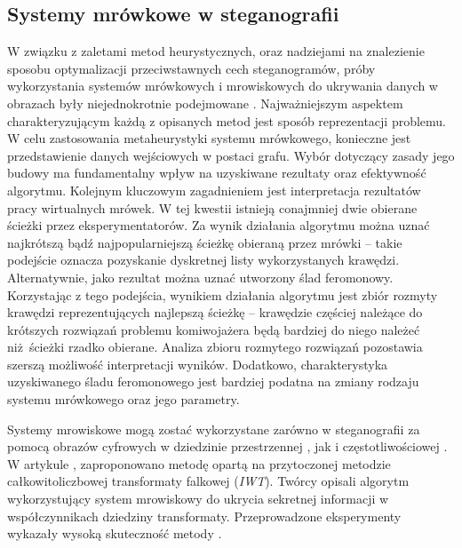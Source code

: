 {{        %
        \subsection{Systemy mrówkowe w steganografii}
        {
            W związku z zaletami metod heurystycznych, oraz nadziejami na znalezienie sposobu optymalizacji
            przeciwstawnych cech steganogramów, próby wykorzystania systemów mrówkowych i mrowiskowych do ukrywania
            danych w obrazach były niejednokrotnie podejmowane \cite{Priya2018HIGHCA, ZghaerACOStegEN, Khan2018AntCO}.
            Najważniejszym aspektem charakteryzującym każdą z opisanych metod jest sposób reprezentacji problemu. W celu
            zastosowania metaheurystyki systemu mrówkowego, konieczne jest przedstawienie danych wejściowych w postaci
            grafu. Wybór dotyczący zasady jego budowy ma fundamentalny wpływ na uzyskiwane rezultaty oraz efektywność
            algorytmu. Kolejnym kluczowym zagadnieniem jest interpretacja rezultatów pracy wirtualnych mrówek. W tej
            kwestii istnieją conajmniej dwie obierane ścieżki przez eksperymentatorów. Za wynik działania algorytmu
            można uznać najkrótszą bądź najpopularniejszą ścieżkę obieraną przez mrówki -- takie podejście oznacza
            pozyskanie dyskretnej listy wykorzystanych krawędzi. Alternatywnie, jako rezultat można uznać utworzony ślad
            feromonowy. Korzystając z tego podejścia, wynikiem działania algorytmu jest zbiór rozmyty krawędzi
            reprezentujących najlepszą ścieżkę -- krawędzie częściej należące do krótszych rozwiązań problemu
            komiwojażera będą bardziej do niego należeć niż ścieżki rzadko obierane. Analiza zbioru rozmytego rozwiązań
            pozostawia szerszą możliwość interpretacji wyników. Dodatkowo, charakterystyka uzyskiwanego śladu
            feromonowego jest bardziej podatna na zmiany rodzaju systemu mrówkowego oraz jego parametry.

            Systemy mrowiskowe mogą zostać wykorzystane zarówno w steganografii za pomocą obrazów cyfrowych w dziedzinie
            przestrzennej  \cite{ZghaerACOStegEN, Khan2018AntCO}, jak i częstotliwościowej \cite{Priya2018HIGHCA}. W
            artykule \cite{Priya2018HIGHCA}, zaproponowano metodę opartą na przytoczonej metodzie całkowitoliczbowej
            transformaty falkowej (\textit{IWT}). Twórcy opisali algorytm wykorzystujący system mrowiskowy do ukrycia
            sekretnej informacji w współczynnikach dziedziny transformaty. Przeprowadzone eksperymenty wykazały wysoką
            skuteczność metody \cite{Priya2018HIGHCA}.

}}}
